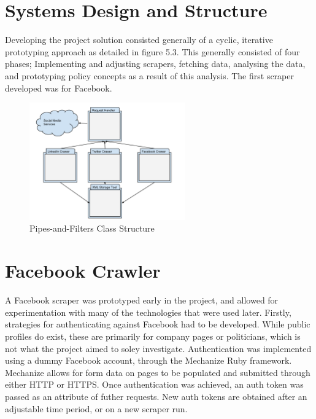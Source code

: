 \section{Systems Design and Structure}

Developing the project solution consisted generally of a cyclic, iterative prototyping approach as detailed in figure 5.3. This generally consisted of four phases; Implementing and adjusting scrapers, fetching data, analysing the data, and prototyping policy concepts as a result of this analysis. The first scraper developed was for Facebook. 

\begin{figure}[h!]
\centering
\includegraphics[width=0.6\textwidth]{Images/Code_Reuse.pdf}
\caption{Pipes-and-Filters Class Structure}
\end{figure}

\section{Facebook Crawler}

A Facebook scraper was prototyped early in the project, and allowed for experimentation with many of the technologies that were used later. Firstly, strategies for authenticating against Facebook had to be developed. While public profiles do exist, these are primarily for company pages or politicians, which is not what the project aimed to soley investigate. Authentication was implemented using a dummy Facebook account, through the Mechanize Ruby framework. Mechanize allows for form data on pages to be populated and submitted through either HTTP or HTTPS. Once authentication was achieved, an auth token was passed as an attribute of futher requests. New auth tokens are obtained after an adjustable time period, or on a new scraper run. 

